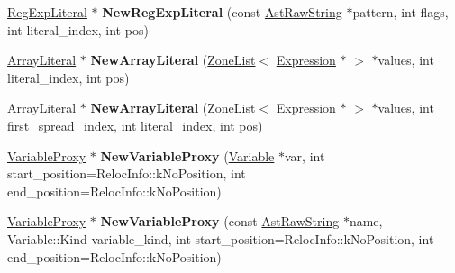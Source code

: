 \begin{DoxyCompactItemize}
\item 
\hyperlink{classv8_1_1internal_1_1_reg_exp_literal}{Reg\+Exp\+Literal} $\ast$ {\bfseries New\+Reg\+Exp\+Literal} (const \hyperlink{classv8_1_1internal_1_1_ast_raw_string}{Ast\+Raw\+String} $\ast$pattern, int flags, int literal\+\_\+index, int pos)\hypertarget{classv8_1_1internal_1_1_b_a_s_e___e_m_b_e_d_d_e_d_a745cdb3343fba5420a01132984789b02}{}\label{classv8_1_1internal_1_1_b_a_s_e___e_m_b_e_d_d_e_d_a745cdb3343fba5420a01132984789b02}

\item 
\hyperlink{classv8_1_1internal_1_1_array_literal}{Array\+Literal} $\ast$ {\bfseries New\+Array\+Literal} (\hyperlink{classv8_1_1internal_1_1_zone_list}{Zone\+List}$<$ \hyperlink{classv8_1_1internal_1_1_expression}{Expression} $\ast$ $>$ $\ast$values, int literal\+\_\+index, int pos)\hypertarget{classv8_1_1internal_1_1_b_a_s_e___e_m_b_e_d_d_e_d_a5aac08054110b328ed65b1553b5cb9a1}{}\label{classv8_1_1internal_1_1_b_a_s_e___e_m_b_e_d_d_e_d_a5aac08054110b328ed65b1553b5cb9a1}

\item 
\hyperlink{classv8_1_1internal_1_1_array_literal}{Array\+Literal} $\ast$ {\bfseries New\+Array\+Literal} (\hyperlink{classv8_1_1internal_1_1_zone_list}{Zone\+List}$<$ \hyperlink{classv8_1_1internal_1_1_expression}{Expression} $\ast$ $>$ $\ast$values, int first\+\_\+spread\+\_\+index, int literal\+\_\+index, int pos)\hypertarget{classv8_1_1internal_1_1_b_a_s_e___e_m_b_e_d_d_e_d_a0a990f78fa8a9491b7aa09b35930f56c}{}\label{classv8_1_1internal_1_1_b_a_s_e___e_m_b_e_d_d_e_d_a0a990f78fa8a9491b7aa09b35930f56c}

\item 
\hyperlink{classv8_1_1internal_1_1_variable_proxy}{Variable\+Proxy} $\ast$ {\bfseries New\+Variable\+Proxy} (\hyperlink{classv8_1_1internal_1_1_variable}{Variable} $\ast$var, int start\+\_\+position=Reloc\+Info\+::k\+No\+Position, int end\+\_\+position=Reloc\+Info\+::k\+No\+Position)\hypertarget{classv8_1_1internal_1_1_b_a_s_e___e_m_b_e_d_d_e_d_a1b2b8a632ae814bf1c992c7ae26f1d5a}{}\label{classv8_1_1internal_1_1_b_a_s_e___e_m_b_e_d_d_e_d_a1b2b8a632ae814bf1c992c7ae26f1d5a}

\item 
\hyperlink{classv8_1_1internal_1_1_variable_proxy}{Variable\+Proxy} $\ast$ {\bfseries New\+Variable\+Proxy} (const \hyperlink{classv8_1_1internal_1_1_ast_raw_string}{Ast\+Raw\+String} $\ast$name, Variable\+::\+Kind variable\+\_\+kind, int start\+\_\+position=Reloc\+Info\+::k\+No\+Position, int end\+\_\+position=Reloc\+Info\+::k\+No\+Position)\hypertarget{classv8_1_1internal_1_1_b_a_s_e___e_m_b_e_d_d_e_d_a3f1c69e2cf3e8ec1385bea6d9333b837}{}\label{classv8_1_1internal_1_1_b_a_s_e___e_m_b_e_d_d_e_d_a3f1c69e2cf3e8ec1385bea6d9333b837}


\end{DoxyCompactItemize}
